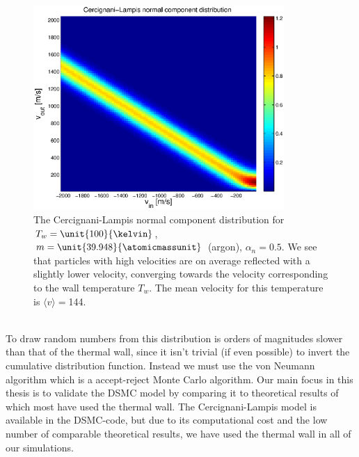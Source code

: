 \begin{figure}[h]
\begin{center}
\includegraphics[width=0.85\textwidth, trim=0cm 0cm 0cm 0cm, clip]{DSMC/figures/cercignani-lampis.eps}
\end{center}
\caption{The Cercignani-Lampis normal component distribution for $T_w=\unit{100}{\kelvin}$, $m=\unit{39.948}{\atomicmassunit}$ (argon), $\alpha_n=0.5$. We see that particles with high velocities are on average reflected with a slightly lower velocity, converging towards the velocity corresponding to the wall temperature $T_w$. The mean velocity for this temperature is $\langle v \rangle = $\unit{144}{\meter\per\second}.}
\label{fig:cercignani_lampis}
\end{figure}
\\
To draw random numbers from this distribution is orders of magnitudes slower than that of the thermal wall, since it isn't trivial (if even possible) to invert the cumulative distribution function. Instead we must use the von Neumann algorithm which is a accept-reject Monte Carlo algorithm\cite{allen1989computer}. Our main focus in this thesis is to validate the DSMC model by comparing it to theoretical results of which most have used the thermal wall. The Cercignani-Lampis model is available in the DSMC-code, but due to its computational cost and the low number of comparable theoretical results, we have used the thermal wall in all of our simulations. 